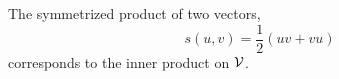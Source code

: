 \begin{lemma}\label{l:inner-product}
	The symmetrized product of two vectors, \[s(u,v) = \frac{1}{2}(uv + vu)\] corresponds to the inner product on $\mathcal{V}$.
\end{lemma}

